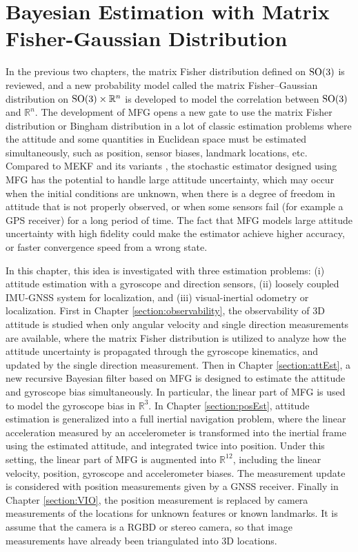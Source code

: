 
\chapter{Bayesian Estimation with Matrix Fisher-Gaussian Distribution} \label{chap:estimation}

In the previous two chapters, the matrix Fisher distribution defined on $\mathrm{SO}(3)$ is reviewed, and a new probability model called the matrix Fisher--Gaussian distribution on $\mathrm{SO}(3)\times \mathbb{R}^n$ is developed to model the correlation between $\mathrm{SO}(3)$ and $\mathbb{R}^n$.
The development of MFG opens a new gate to use the matrix Fisher distribution or Bingham distribution in a lot of classic estimation problems where the attitude and some quantities in Euclidean space must be estimated simultaneously, such as position, sensor biases, landmark locations, etc.
Compared to MEKF and its variants \cite{mourikis2007multi,sola2017quaternion}, the stochastic estimator designed using MFG has the potential to handle large attitude uncertainty, which may occur when the initial conditions are unknown, when there is a degree of freedom in attitude that is not properly observed, or when some sensors fail (for example a GPS receiver) for a long period of time.
The fact that MFG models large attitude uncertainty with high fidelity could make the estimator achieve higher accuracy, or faster convergence speed from a wrong state.

In this chapter, this idea is investigated with three estimation problems: (i) attitude estimation with a gyroscope and direction sensors, (ii) loosely coupled IMU-GNSS system for localization, and (iii) visual-inertial odometry or localization.
First in Chapter \ref{section:observability}, the observability of 3D attitude is studied when only angular velocity and single direction measurements are available, where the matrix Fisher distribution is utilized to analyze how the attitude uncertainty is propagated through the gyroscope kinematics, and updated by the single direction measurement.
Then in Chapter \ref{section:attEst}, a new recursive Bayesian filter based on MFG is designed to estimate the attitude and gyroscope bias simultaneously.
In particular, the linear part of MFG is used to model the gyroscope bias in $\mathbb{R}^3$.
In Chapter \ref{section:posEst}, attitude estimation is generalized into a full inertial navigation problem, where the linear acceleration measured by an accelerometer is transformed into the inertial frame using the estimated attitude, and integrated twice into position.
Under this setting, the linear part of MFG is augmented into $\mathbb{R}^{12}$, including the linear velocity, position, gyroscope and accelerometer biases.
The measurement update is considered with position measurements given by a GNSS receiver.
Finally in Chapter \ref{section:VIO}, the position measurement is replaced by camera measurements of the locations for unknown features or known landmarks.
It is assume that the camera is a RGBD or stereo camera, so that image measurements have already been triangulated into 3D locations.

